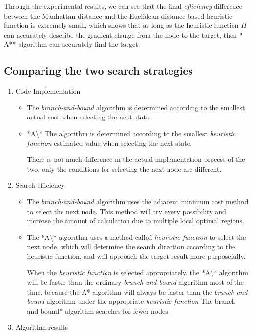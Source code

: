 \documentclass[
]{article}
\begin{document}
Through the experimental results, we can see that the final
\emph{efficiency} difference between the Manhattan distance and the
Euclidean distance-based heuristic function is extremely small, which
shows that as long as the heuristic function \(H\) can accurately
describe the gradient change from the node to the target, then * A**
algorithm can accurately find the target.

\hypertarget{header-n463}{%
\subsection{Comparing the two search strategies}\label{header-n463}}

\begin{enumerate}
\def\labelenumi{\arabic{enumi}.}
\item
  Code Implementation

  \begin{itemize}
  \item
    The \emph{branch-and-bound} algorithm is determined according to the
    smallest actual cost when selecting the next state.
  \item
    *A\textbackslash** The algorithm is determined according to the
    smallest \emph{heuristic function} estimated value when selecting
    the next state.

    There is not much difference in the actual implementation process of
    the two, only the conditions for selecting the next node are
    different.
  \end{itemize}
\item
  Search efficiency

  \begin{itemize}
  \item
    The \emph{branch-and-bound} algorithm uses the adjacent minimum cost
    method to select the next node. This method will try every
    possibility and increase the amount of calculation due to multiple
    local optimal regions.
  \item
    The *A\textbackslash** algorithm uses a method called
    \emph{heuristic function} to select the next node, which will
    determine the search direction according to the heuristic function,
    and will approach the target result more purposefully.

    When the \emph{heuristic function} is selected appropriately, the
    *A\textbackslash** algorithm will be faster than the ordinary
    \emph{branch-and-bound} algorithm most of the time, because the A*
    algorithm will always be faster than the \emph{branch-and-bound}
    algorithm under the appropriate \emph{heuristic function} The
    branch-and-bound* algorithm searches for fewer nodes.
  \end{itemize}
\item
  Algorithm results


\end{enumerate}
\end{document}

